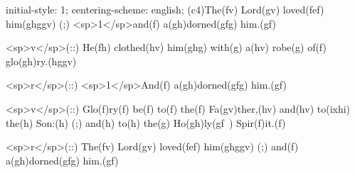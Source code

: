 initial-style: 1;
centering-scheme: english;
(c4)The(fv) Lord(gv) loved(fef) him(ghggv) (;) <sp>1</sp>and(f) a(gh)dorned(gfg) him.(gf)

<sp>v</sp>(::) He(fh) clothed(hv) him(ghg) with(g) a(hv) robe(g) of(f) glo(gh)ry.(hggv)

<sp>r</sp>(::) <sp>1</sp>And(f) a(gh)dorned(gfg) him.(gf)

<sp>v</sp>(::) Glo(f)ry(f) be(f) to(f) the(f) Fa(gv)ther,(hv) and(hv) to(ixhi) the(h) Son:(h) (;) and(h) to(h) the(g) Ho(gh)ly(gf~) Spir(f)it.(f)

<sp>r</sp>(::) The(fv) Lord(gv) loved(fef) him(ghggv) (;) and(f) a(gh)dorned(gfg) him.(gf)